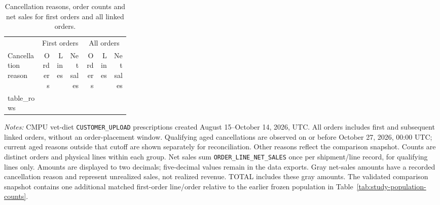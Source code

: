 \begin{table}[htbp]
\centering
\caption{Cancellation reasons, order counts and net sales for first orders and all linked orders.}
\label{tab:first-all-order-cancellations}
\small
\setlength{\tabcolsep}{5pt}
\begin{tabular}{@{}>{\raggedright\arraybackslash}p{0.28\linewidth}rrrrrr@{}}
\toprule
 & \multicolumn{3}{c}{First orders} & \multicolumn{3}{c}{All orders} \\
\cmidrule(lr){2-4}\cmidrule(lr){5-7}
Cancellation reason & Orders & Lines & Net sales & Orders & Lines & Net sales \\
\midrule
{{ table_rows }}
\bottomrule
\end{tabular}

\begin{minipage}{\linewidth}
\footnotesize
\textit{Notes:} CMPU vet-diet \texttt{CUSTOMER\_UPLOAD} prescriptions created
August 15--October 14, 2026, UTC. All orders includes first and subsequent linked
orders, without an order-placement window. Qualifying aged cancellations are
observed on or before October 27, 2026, 00:00 UTC; current aged reasons outside
that cutoff are shown separately for reconciliation. Other reasons reflect
the comparison snapshot. Counts are distinct orders and physical lines within
each group. Net sales sum \texttt{ORDER\_LINE\_NET\_SALES} once per
shipment/line record, for qualifying lines only. Amounts are displayed
to two decimals; five-decimal values remain in the data exports.
Gray net-sales amounts have a recorded cancellation reason and represent
unrealized sales, not realized revenue. TOTAL includes these gray amounts.
The validated comparison snapshot contains one additional matched first-order
line/order relative to the earlier frozen population in Table~\ref{tab:study-population-counts}.
\end{minipage}
\end{table}
